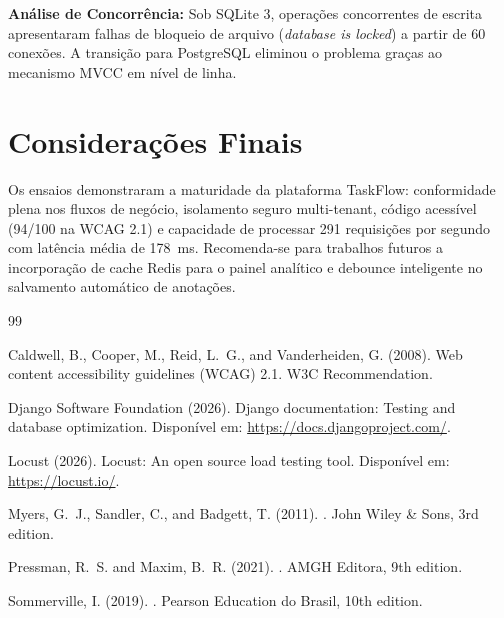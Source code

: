 \documentclass[12pt]{article}
\begin{document}
\noindent \textbf{Análise de Concorrência:} Sob SQLite 3, operações concorrentes de escrita apresentaram falhas de bloqueio de arquivo (\textit{database is locked}) a partir de 60 conexões. A transição para PostgreSQL eliminou o problema graças ao mecanismo MVCC em nível de linha.

\section{Considerações Finais}

Os ensaios demonstraram a maturidade da plataforma TaskFlow: conformidade plena nos fluxos de negócio, isolamento seguro multi-tenant, código acessível (94/100 na WCAG 2.1) e capacidade de processar 291 requisições por segundo com latência média de 178~ms. Recomenda-se para trabalhos futuros a incorporação de cache Redis para o painel analítico e debounce inteligente no salvamento automático de anotações.


\begin{thebibliography}{99}

Caldwell, B., Cooper, M., Reid, L.~G., and Vanderheiden, G. (2008).
\newblock Web content accessibility guidelines (WCAG) 2.1.
\newblock W3C Recommendation.

Django Software Foundation (2026).
\newblock Django documentation: Testing and database optimization.
\newblock Disponível em: \url{https://docs.djangoproject.com/}.

Locust (2026).
\newblock Locust: An open source load testing tool.
\newblock Disponível em: \url{https://locust.io/}.

Myers, G.~J., Sandler, C., and Badgett, T. (2011).
.
\newblock John Wiley \& Sons, 3rd edition.

Pressman, R.~S. and Maxim, B.~R. (2021).
.
\newblock AMGH Editora, 9th edition.

Sommerville, I. (2019).
.
\newblock Pearson Education do Brasil, 10th edition.

\end{thebibliography}
\end{document}
